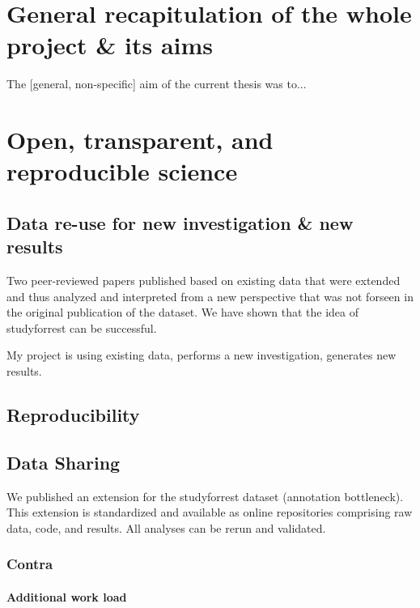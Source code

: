 \section{General recapitulation of the whole project \& its aims}


The [general, non-specific] aim of the current thesis was to...




\section{Open, transparent, and reproducible science}


\subsection{Data re-use for new investigation \& new results}
%
Two peer-reviewed papers published based on existing data that were extended and
thus analyzed and interpreted from a new perspective that was not forseen in the
original publication of the dataset.
%
We have shown that the idea of studyforrest can be successful.

%
My project is using existing data, performs a new investigation, generates new
results.


\subsection{Reproducibility}

\subsection{Data Sharing}


We published an extension for the studyforrest dataset (annotation bottleneck).
%
This extension is standardized and available as online repositories comprising
raw data, code, and results.
%
All analyses can be rerun and validated.


\subsubsection{Contra}

\paragraph{Additional work load}

